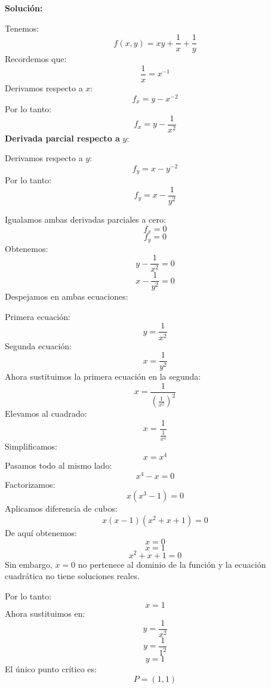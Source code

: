 \documentclass[12pt,a4paper]{report}
\newcommand{\solutionname}{Solución:}
\newenvironment{solution}{
 	\par\noindent\textbf{\color{structurecolor}\solutionname}
 	\color{black!90}}{\hfill\quad\par}
\begin{document}
\begin{solution}
\begin{enumerate}
Tenemos:
\[
f(x,y)=xy+\frac{1}{x}+\frac{1}{y}
\]
Recordemos que:
\[
\frac{1}{x}=x^{-1}
\]
Derivamos respecto a \(x\):
\[
f_x=y-x^{-2}
\]
Por lo tanto:
\[
f_x=y-\frac{1}{x^2}
\]
\textbf{Derivada parcial respecto a} \(y\):

Derivamos respecto a \(y\):
\[
f_y=x-y^{-2}
\]
Por lo tanto:
\[
f_y=x-\frac{1}{y^2}
\]

Igualamos ambas derivadas parciales a cero:
\[
f_x=0
\]
\[
f_y=0
\]
Obtenemos:
\[
y-\frac{1}{x^2}=0
\]
\[
x-\frac{1}{y^2}=0
\]
Despejamos en ambas ecuaciones:

Primera ecuación:
\[
y=\frac{1}{x^2}
\]
Segunda ecuación:
\[
x=\frac{1}{y^2}
\]
Ahora sustituimos la primera ecuación en la segunda:
\[
x=\frac{1}{\left(\frac{1}{x^2}\right)^2}
\]
Elevamos al cuadrado:
\[
x=\frac{1}{\frac{1}{x^4}}
\]
Simplificamos:
\[
x=x^4
\]
Pasamos todo al mismo lado:
\[
x^4-x=0
\]
Factorizamos:
\[
x(x^3-1)=0
\]
Aplicamos diferencia de cubos:
\[
x(x-1)(x^2+x+1)=0
\]
De aquí obtenemos:
\[
x=0
\]
\[
x=1
\]
\[
x^2+x+1=0
\]
Sin embargo, \(x=0\) no pertenece al dominio de la función y la ecuación cuadrática no tiene soluciones reales.

Por lo tanto:
\[
x=1
\]
Ahora sustituimos en:
\[
y=\frac{1}{x^2}
\]
\[
y=\frac{1}{1^2}
\]
\[
y=1
\]
El único punto crítico es:
\[
P=(1,1)
\]


\end{enumerate}
\end{solution}
\end{document}
